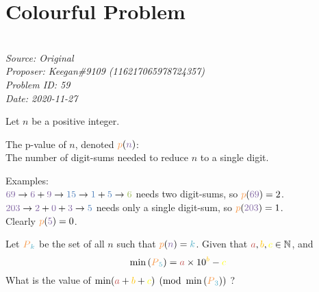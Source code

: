 \documentclass[titlepage=true]{scrartcl}
\def\Pkee{Keegan\#9109 (116217065978724357)}
\begin{document}
\newpage 

\section{Colourful Problem}
         \SSbreak\\
         \emph{Source: Original}\\
         \emph{Proposer: \Pkee}\\
         \emph{Problem ID: 59}\\
         \emph{Date: 2020-11-27}\\
         \SSbreak

         \begin{mdframed}[backgroundcolor=pagegray,rightline=false,leftline=false, topline=false, bottomline=false]
             \color{white}
             Let \textcolor{qpurple}{$n$} be a positive integer.
             \par
             The \textcolor{qlorange}{p-value} of \textcolor{qpurple}{$n$}, denoted $\persistk{n}$: \\

             The number of digit-sums needed to reduce \textcolor{qpurple}{$n$} to a single digit.
             \par
             Examples: \\

             $\textcolor{qpurple}{69} \rightarrow \textcolor{qpurple}{6} + \textcolor{qpurple}{9} \rightarrow \textcolor{qblue}{15} \rightarrow \textcolor{qblue}{1} + \textcolor{qblue}{5} \rightarrow \textcolor{qgreen}{6}$ needs two digit-sums, so $\persistk{69} = 2$. \\
             $\textcolor{qpurple}{203} \rightarrow \textcolor{qpurple}{2} + \textcolor{qpurple}{0} +  \textcolor{qpurple}{3} \rightarrow \textcolor{qblue}{5}$ needs only a single digit-sum, so $\persistk{203} = 1$. \\
             Clearly $\persistk{5} = 0$.\\

             \par
             Let $\persistsetk{k}$ be the set of all \textcolor{qpurple}{$n$} such that $\persistk{n} = \textcolor{qlblue}{k}$. Given that $\textcolor{qred}{a}, \textcolor{qorange}{b}, \textcolor{qyellow}{c} \in \mathbb{N}$, and
             \begin{equation*}
                 \min{(\persistsetk{5})} = \textcolor{qred}{a}\times 10^{\textcolor{qorange}{b}} - \textcolor{qyellow}{c}
             \end{equation*}
             What is the value of $\min(\textcolor{qred}{a} + \textcolor{qorange}{b} + \textcolor{qyellow}{c}) \pmod{\min{(\persistsetk{3})}}$ ?
         \end{mdframed}
         \color{black}
         \bigskip

         \begin{solution}
             
         \end{solution}
\end{document}
